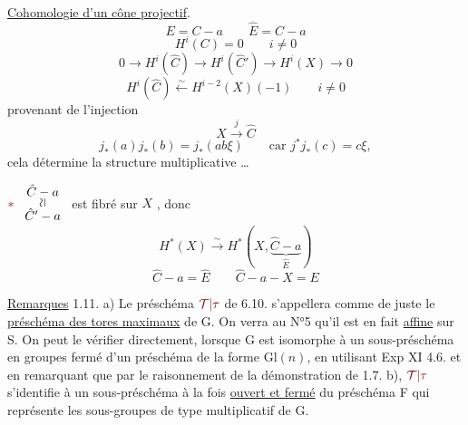 \uline{Cohomologie d'un cône projectif}.
\margin{\deleted{$\unsure{\sim}$}}
\[
E=C-a\qquad \hat E=\hat C-a
\]
\[
\boxed{H^i(C)=0\qquad i\ne0}
\]
\[
0\longrightarrow H^i(\hat C)\longrightarrow H^i(\hat C')
\longrightarrow H^i(X)\longrightarrow0
\]
\[
\boxed{H^i(\hat C)\xleftarrow{\sim}H^{i-2}(X)(-1)\qquad i\ne0}
\]
provenant de l'injection
\[
X\xrightarrow{j}\hat C
\]
\[
j_*(a)j_*(b)=j_*(ab\xi)\qquad\text{car }j^*j_*(c)=c\xi,
\]
cela détermine la structure multiplicative \ldots

$\unsure{*}\ \begin{array}{c}\hat C-a\\[-3pt]\rotatebox{90}{$\simeq$}\\[-3pt]\hat C'-a\end{array}$
est fibré sur $X$ 
,
donc
\[
\boxed{H^*(X)\xrightarrow{\sim}H^*(X,\underbrace{\hat C-a}_{\hat E})}
\]
\[
\hat C-a=\hat E\qquad \hat C-a-X=E
\]
\margin{\deleted{$\unsure{\simeq}$}\quad\deleted{$\unsure{\simeq}$}}

\uline{Remarques} 1.11. a) Le préschéma $\unsure{\mathcal T|\tau}$ de 6.10. s'appellera comme de juste le
\uline{préschéma des tores maximaux} de G. On verra au N°5 qu'il est en fait \uline{affine}
sur S. On peut le vérifier directement, lorsque G est isomorphe à un
sous-préschéma en groupes fermé d'un préschéma de la forme $\mathrm{Gl}(n)$, en
utilisant Exp XI 4.6. et en remarquant que par le raisonnement de la
démonstration de 1.7. b), $\unsure{\mathcal T|\tau}$ s'identifie à un sous-préschéma à la fois
\uline{ouvert et fermé} du préschéma F qui représente les sous-groupes de type
multiplicatif de G.

